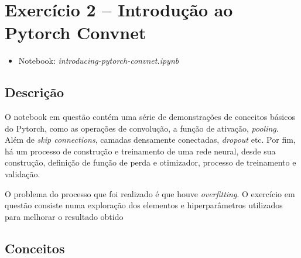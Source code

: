 \section{Exercício 2 -- Introdução ao Pytorch Convnet}

\begin{itemize}
	\item Notebook: \textit{introducing-pytorch-convnet.ipynb}
\end{itemize}

\subsection{Descrição}

O notebook em questão contém uma série de demonstrações de conceitos básicos do Pytorch, como as operações de convolução, a função de ativação, \textit{pooling}. Além de \textit{skip connections}, camadas densamente conectadas, \textit{dropout} etc. Por fim, há um processo de construção e treinamento de uma rede neural, desde sua construção, definição de função de perda e otimizador, processo de treinamento e validação.

O problema do processo que foi realizado é que houve \textit{overfitting}. O exercício em questão consiste numa exploração dos elementos e hiperparâmetros utilizados para melhorar o resultado obtido

\subsection{Conceitos}